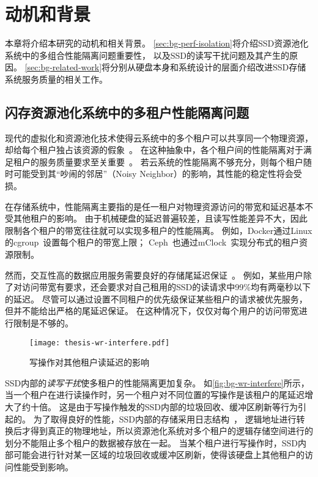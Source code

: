 
\chapter{动机和背景}
\label{chap:background}

本章将介绍本研究的动机和相关背景。
\autoref{sec:bg-perf-isolation}将介绍SSD资源池化系统中的多组合性能隔离问题重要性，
以及SSD的读写干扰问题及其产生的原因。
\autoref{sec:bg-related-work}将分别从硬盘本身和系统设计的层面介绍改进SSD存储系统服务质量的相关工作。

\section{闪存资源池化系统中的多租户性能隔离问题}
\label{sec:bg-perf-isolation}

现代的虚拟化和资源池化技术使得云系统中的多个租户可以共享同一个物理资源，却给每个租户独占该资源的假象~\cite{bugnion2017hardware}。
在这种抽象中，各个租户间的性能隔离对于满足租户的服务质量要求至关重要~\cite{somani2009isolation}。
若云系统的性能隔离不够充分，则每个租户随时可能受到其“吵闹的邻居”（Noisy Neighbor）的影响，其性能的稳定性将会受损。

在存储系统中，性能隔离主要指的是任一租户对物理资源访问的带宽和延迟基本不受其他租户的影响。
由于机械硬盘的延迟普遍较差，且读写性能差异不大，因此限制各个租户的带宽往往就可以实现多租户的性能隔离。
例如，Docker通过Linux的cgroup~\cite{cgroup}设置每个租户的带宽上限；
Ceph~\cite{weil2006ceph}也通过mClock~\cite{gulati2010mclock}实现分布式的租户资源限制。

然而，交互性高的数据应用服务需要良好的存储尾延迟保证~\cite{dean2013tail,hao2016tail}。
例如，某些用户除了对访问带宽有要求，还会要求对自己租用的SSD的读请求中99\%均有两毫秒以下的延迟。
尽管可以通过设置不同租户的优先级保证某些租户的请求被优先服务，但并不能给出严格的尾延迟保证。
在这种情况下，仅仅对每个用户的访问带宽进行限制是不够的。

\begin{figure}[h]
  \centering
  \texttt{[image: thesis-wr-interfere.pdf]}
  \caption{写操作对其他租户读延迟的影响}
  \label{fig:bg-wr-interfere}
\end{figure}

SSD内部的\textit{读写干扰}使多租户的性能隔离更加复杂。
如\autoref{fig:bg-wr-interfere}所示，当一个租户在进行读操作时，另一个租户对不同位置的写操作是该租户的尾延迟增大了约十倍。
这是由于写操作触发的SSD内部的垃圾回收、缓冲区刷新等行为引起的。
为了取得良好的性能，SSD内部的存储采用日志结构~\cite{ArpaciDusseau18-Book}，
逻辑地址进行转换后才得到真正的物理地址，所以资源池化系统对多个租户的逻辑存储空间进行的划分不能阻止多个租户的数据被存放在一起。
当某个租户进行写操作时，SSD内部可能会进行针对某一区域的垃圾回收或缓冲区刷新，使得该硬盘上其他租户的访问性能受到影响。

